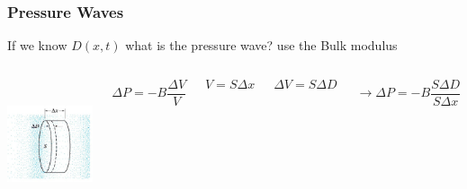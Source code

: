 \documentclass[]{beamer}
\begin{document}

\begin{frame}
\frametitle{Pressure Waves}
If we know $D(x,t)$ \pause what is the pressure wave?  \pause \textcolor{mypink1}{use the Bulk modulus}

\pause





   \begin{columns}[c]
   \column{1.8in}  %
  
  \begin{center}
  \includegraphics[height=1.5in]{images4/Pressurewave.jpg}
\end{center}

   \column{2.2in}

   \begin{equation*}
    \Delta P=-B\frac{\Delta V}{V}
    \end{equation*}
    
    \pause
    \begin{equation*}
      V=S\Delta x
      \end{equation*}
    

\pause


\begin{equation*}
  \Delta V=S\Delta D
\end{equation*}


\pause


\begin{equation*}
\rightarrow \Delta P=-B\frac{S\Delta D}{S\Delta x}
\end{equation*}


   \end{columns}




  \end{frame}
\end{document}
